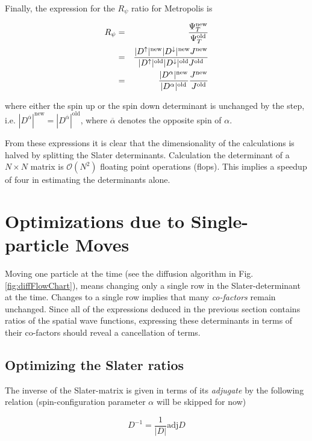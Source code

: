 Finally, the expression for the $R_\psi$ ratio for Metropolis is

\begin{eqnarray}
 R_\psi &=& \frac{\Psi_T^\mathrm{new}}{\Psi_T^\mathrm{old}} \nonumber\\
        &=& \frac{|D^\uparrow|^\mathrm{new} |D^\downarrow|^\mathrm{new} J^\mathrm{new}}{|D^\uparrow|^\mathrm{old} |D^\downarrow|^\mathrm{old} J^\mathrm{old}} \nonumber\\
        &=& \frac{|D^\alpha|^\mathrm{new}}{|D^\alpha|^\mathrm{old}}\frac{J^\mathrm{new}}{J^\mathrm{old}} \label{eq:RpsiOpt}
\end{eqnarray}

where either the spin up or the spin down determinant is unchanged by the step, i.e. $|D^{\overline{\alpha}}|^\mathrm{new} = |D^{\overline{\alpha}}|^\mathrm{old}$, where $\overline{\alpha}$ denotes the opposite spin of $\alpha$. 

From these expressions it is clear that the dimensionality of the calculations is halved by splitting the Slater determinants. Calculation the determinant of a $N\times N$ matrix is $\mathcal{O}(N^2)$ floating point operations (flops). This implies a speedup of four in estimating the determinants alone. 

\section{Optimizations due to Single-particle Moves}

Moving one particle at the time (see the diffusion algorithm in Fig. \ref{fig:diffFlowChart}), means changing only a single row in the Slater-determinant at the time. Changes to a single row implies that many \textit{co-factors} remain unchanged. Since all of the expressions deduced in the previous section contains ratios of the spatial wave functions, expressing these determinants in terms of their co-factors should reveal a cancellation of terms. 

\subsection{Optimizing the Slater ratios}
\label{sec:optSlaterRat}

The inverse of the Slater-matrix is given in terms of its \textit{adjugate} by the following relation \cite{linAlg} (spin-configuration parameter $\alpha$ will be skipped for now)

\begin{equation*}
 D^{-1} = \frac{1}{|D|}\mathrm{adj} D
\end{equation*}

